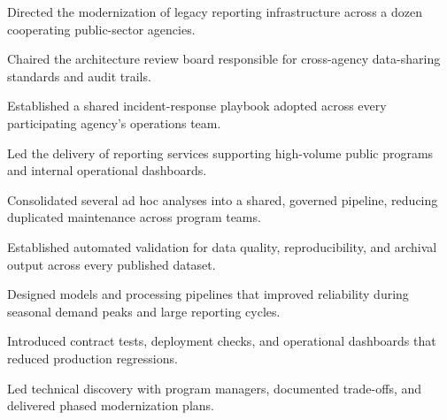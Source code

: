 \documentclass[fontsize=11pt, margin=narrow, medium=print]{careerdossier-resume}
\begin{document}
\MakeCDossierHeader

\begin{CDossierEntry}[title = {Distinguished Engineer}, organization = {Continental Reliability Consortium}, location = {Ottawa, ON}, dates = {2024--Present}]
  \begin{CDossierItemize}
    \item Directed the modernization of legacy reporting infrastructure across a dozen cooperating public-sector agencies.
    \item Chaired the architecture review board responsible for cross-agency data-sharing standards and audit trails.
    \item Established a shared incident-response playbook adopted across every participating agency's operations team.
  \end{CDossierItemize}
\end{CDossierEntry}
\begin{CDossierEntry}[title = {Principal Engineer}, organization = {Northbridge Systems}, location = {Toronto, ON}, dates = {2022--2024}]
  \begin{CDossierItemize}
    \item Led the delivery of reporting services supporting high-volume public programs and internal operational dashboards.
    \item Consolidated several ad hoc analyses into a shared, governed pipeline, reducing duplicated maintenance across program teams.
    \item Established automated validation for data quality, reproducibility, and archival output across every published dataset.
  \end{CDossierItemize}
\end{CDossierEntry}
\begin{CDossierEntry}[title = {Senior Engineer}, organization = {Civic Technology Research Group}, location = {Toronto, ON}, dates = {2019--2022}]
  \begin{CDossierItemize}
    \item Designed models and processing pipelines that improved reliability during seasonal demand peaks and large reporting cycles.
    \item Introduced contract tests, deployment checks, and operational dashboards that reduced production regressions.
    \item Led technical discovery with program managers, documented trade-offs, and delivered phased modernization plans.
  \end{CDossierItemize}
\end{CDossierEntry}
\end{document}
